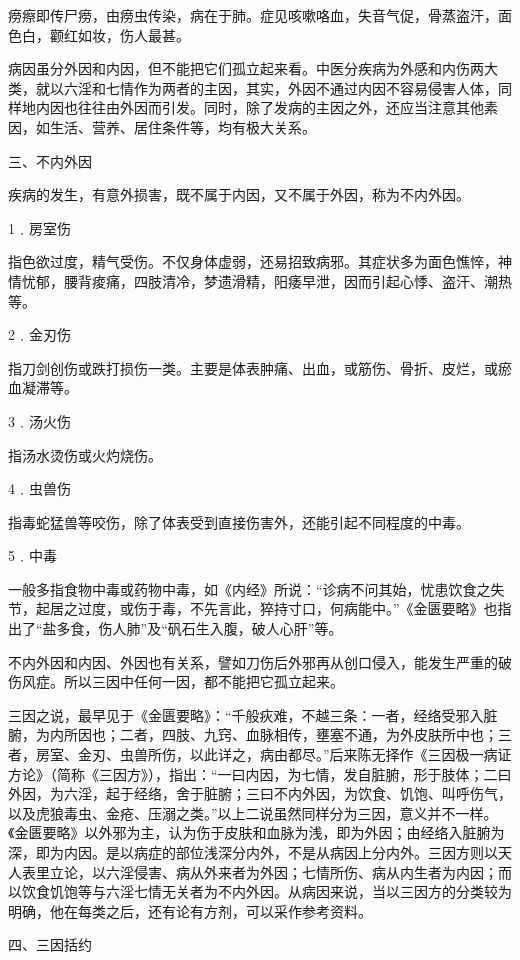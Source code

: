 \documentclass[a4paper,12pt,UTF8,twoside]{ctexbook}
\begin{document}
痨瘵即传尸痨，由痨虫传染，病在于肺。症见咳嗽咯血，失音气促，骨蒸盗汗，面色白，颧红如妆，伤人最甚。

病因虽分外因和内因，但不能把它们孤立起来看。中医分疾病为外感和内伤两大类，就以六淫和七情作为两者的主因，其实，外因不通过内因不容易侵害人体，同样地内因也往往由外因而引发。同时，除了发病的主因之外，还应当注意其他素因，如生活、营养、居住条件等，均有极大关系。

三、不内外因

疾病的发生，有意外损害，既不属于内因，又不属于外因，称为不内外因。

1﹒房室伤

指色欲过度，精气受伤。不仅身体虚弱，还易招致病邪。其症状多为面色憔悴，神情忧郁，腰背痠痛，四肢清冷，梦遗滑精，阳痿早泄，因而引起心悸、盗汗、潮热等。

2﹒金刃伤

指刀剑创伤或跌打损伤一类。主要是体表肿痛、出血，或筋伤、骨折、皮烂，或瘀血凝滞等。

3﹒汤火伤

指汤水烫伤或火灼烧伤。

4﹒虫兽伤

指毒蛇猛兽等咬伤，除了体表受到直接伤害外，还能引起不同程度的中毒。

5﹒中毒

一般多指食物中毒或药物中毒，如《内经》所说：“诊病不问其始，忧患饮食之失节，起居之过度，或伤于毒，不先言此，猝持寸口，何病能中。”《金匮要略》也指出了“盐多食，伤人肺”及“矾石生入腹，破人心肝”等。

不内外因和内因、外因也有关系，譬如刀伤后外邪再从创口侵入，能发生严重的破伤风症。所以三因中任何一因，都不能把它孤立起来。

三因之说，最早见于《金匮要略》：“千般疢难，不越三条：一者，经络受邪入脏腑，为内所因也；二者，四肢、九窍、血脉相传，壅塞不通，为外皮肤所中也；三者，房室、金刃、虫兽所伤，以此详之，病由都尽。”后来陈无择作《三因极一病证方论》（简称《三因方》），指出：“一曰内因，为七情，发自脏腑，形于肢体；二曰外因，为六淫，起于经络，舍于脏腑；三曰不内外因，为饮食、饥饱、叫呼伤气，以及虎狼毒虫、金疮、压溺之类。”以上二说虽然同样分为三因，意义并不一样。《金匮要略》以外邪为主，认为伤于皮肤和血脉为浅，即为外因；由经络入脏腑为深，即为内因。是以病症的部位浅深分内外，不是从病因上分内外。三因方则以天人表里立论，以六淫侵害、病从外来者为外因；七情所伤、病从内生者为内因；而以饮食饥饱等与六淫七情无关者为不内外因。从病因来说，当以三因方的分类较为明确，他在每类之后，还有论有方剂，可以采作参考资料。

四、三因括约
\end{document}
